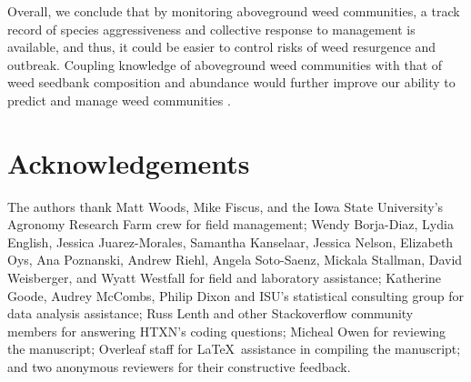 \documentclass[
]{article}
\begin{document}
Overall, we conclude that by monitoring aboveground weed communities, a track record of species aggressiveness and collective response to management is available, and thus, it could be easier to control risks of weed resurgence and outbreak. Coupling knowledge of aboveground weed communities with that of weed seedbank composition and abundance would further improve our ability to predict and manage weed communities \citep{forcellaWeedSeedbanksCorn1992, menalledWeedAbovegroundSeedbank2001, forcellaDebitingSeedbankPriorities2003, davisWeedSeedbankCommunity2005}.

\hypertarget{acknowledgements}{%
\section*{Acknowledgements}\label{acknowledgements}}

The authors thank Matt Woods, Mike Fiscus, and the Iowa State University's Agronomy Research Farm crew for field management; Wendy Borja-Diaz, Lydia English, Jessica Juarez-Morales, Samantha Kanselaar, Jessica Nelson, Elizabeth Oys, Ana Poznanski, Andrew Riehl, Angela Soto-Saenz, Mickala Stallman, David Weisberger, and Wyatt Westfall for field and laboratory assistance; Katherine Goode, Audrey McCombs, Philip Dixon and ISU's statistical consulting group for data analysis assistance; Russ Lenth and other Stackoverflow community members for answering HTXN's coding questions; Micheal Owen for reviewing the manuscript; Overleaf staff for \LaTeX~assistance in compiling the manuscript; and two anonymous reviewers for their constructive feedback.

\renewcommand\refname{References}
  
\end{document}
